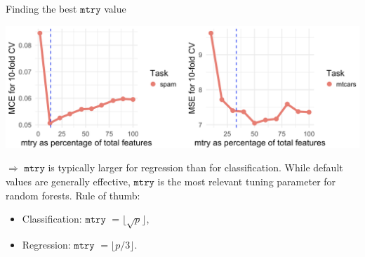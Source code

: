 \documentclass[11pt,compress,t,notes=noshow, xcolor=table]{beamer}
\begin{document}
\begin{vbframe}{Finding the best $\texttt{mtry}$ value}

\begin{center}
\includegraphics[width=1\textwidth]{figure/forest-mtry.png}
\end{center}

$\Rightarrow$ $\texttt{mtry}$ is typically larger for regression than for classification. While default values are generally effective, $\texttt{mtry}$ is the most relevant tuning parameter for random forests. Rule of thumb:

\begin{itemize}
\item Classification: $\texttt{mtry}$ $ = \lfloor \sqrt{p} \rfloor$,
\item Regression: $\texttt{mtry}$ $ = \lfloor p/3 \rfloor$.
\end{itemize}

\end{vbframe}
\end{document}
